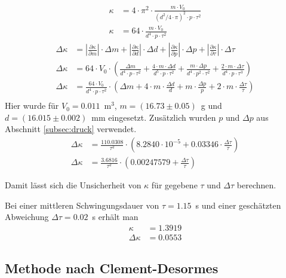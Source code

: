\documentclass{article}
\begin{document}
\begin{align}
\kappa &= 4\cdot \pi^2 \cdot \frac{m\cdot V_0}{\left(d^2/4\cdot \pi\right)^2\cdot p\cdot \tau^2} \\
\kappa &= 64\cdot \frac{m\cdot V_0}{d^4\cdot p\cdot \tau^2} 
\end{align}
\begin{align}
\Delta \kappa &= \left| \frac{\partial \kappa}{\partial m} \right| \cdot \Delta m + \left| \frac{\partial \kappa}{\partial d} \right| \cdot \Delta d + \left| \frac{\partial \kappa}{\partial p} \right| \cdot \Delta p + \left| \frac{\partial \kappa}{\partial \tau} \right| \cdot \Delta \tau \\
\Delta \kappa &= 64\cdot V_0\cdot  \left( \frac{\Delta m}{d^4\cdot p\cdot \tau^2} + \frac{4\cdot m\cdot\Delta d}{d^5\cdot p\cdot \tau^2} + \frac{m\cdot \Delta p}{d^4\cdot p^2\cdot \tau^2} + \frac{2\cdot m\cdot\Delta\tau}{d^4\cdot p\cdot \tau^3} \right) \\
\Delta \kappa &= \frac{64\cdot V_0}{d^4\cdot p\cdot \tau^2}\cdot \left( \Delta m + 4\cdot m\cdot \frac{\Delta d}{d} + m\cdot \frac{\Delta p}{p} + 2\cdot m\cdot \frac{\Delta \tau}{\tau}\right) \\
\end{align}
Hier wurde für $V_0 = 0.011$~m${}^3$, $m=(16.73\pm0.05)$~g und $d=(16.015\pm0.002)$~mm eingesetzt. Zusätzlich wurden $p$ und $\Delta p$ aus Abschnitt \ref{subsec:druck} verwendet.
\begin{align}
\Delta \kappa &= \frac{110.0308}{\tau^2}\cdot \left(8.2840\cdot 10^{-5} + 0.03346\cdot \frac{\Delta \tau}{\tau}\right) \\
\Delta \kappa &= \frac{3.6816}{\tau^2}\cdot \left(0.00247579 + \frac{\Delta \tau}{\tau}\right)
\end{align}

Damit lässt sich die Unsicherheit von $\kappa$ für gegebene $\tau$ und $\Delta \tau$ berechnen.

Bei einer mittleren Schwingungsdauer von $\tau=1.15$~s und einer geschätzten Abweichung $\Delta \tau = 0.02$~s erhält man
\begin{align}
\kappa &= 1.3919 \\
\Delta \kappa &= 0.0553
\end{align}



\subsection{Methode nach Clement-Desormes}
\end{document}
